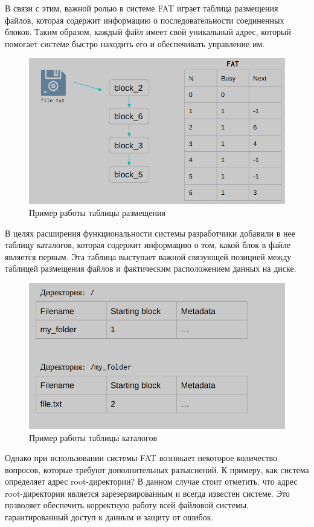 \documentclass[a4paper,12pt]{article}
\begin{document}
    В связи с этим, важной ролью в системе FAT играет таблица размещения файлов, которая содержит информацию о последовательности соединенных блоков. Таким образом, каждый файл имеет свой уникальный адрес, который помогает системе быстро находить его и обеспечивать управление им.
    \begin{figure}[H]
        \centering
        \includegraphics[width=0.8\linewidth]{img2}
        \caption{Пример работы таблицы размещения}
    \end{figure}
    В целях расширения функциональности системы разработчики добавили в нее таблицу каталогов, которая содержит информацию о том, какой блок в файле является первым. Эта таблица выступает важной связующей позицией между таблицей размещения файлов и фактическим расположением данных на диске.
    \begin{figure}[H]
        \centering
        \includegraphics[width=0.8\linewidth]{img3}
        \caption{Пример работы таблицы каталогов}
    \end{figure}
    Однако при использовании системы FAT возникает некоторое количество вопросов, которые требуют дополнительных разъяснений. К примеру, как система определяет адрес root-директории? В данном случае стоит отметить, что адрес root-директории является зарезервированным и всегда известен системе. Это позволяет обеспечить корректную работу всей файловой системы, гарантированный доступ к данным и защиту от ошибок.
    
\end{document}
